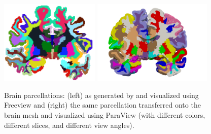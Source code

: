 %
%
\begin{figure}
\begin{center}
  \hspace{2em}
  \includegraphics[height=4cm]{./graphics/chp4/parcellation-coronalwhiteBG_2.png}
  \includegraphics[height=4cm]{./graphics/chp4/ernie32-parcellation-basic.png}
  \caption{Brain parcellations: (left) as generated by \freesurfer{} and visualized 
   using Freeview and (right) the same parcellation transferred onto the {\fenics} 
   brain mesh and visualized using ParaView (with different colors, different 
   slices, and different view angles).} 
  \label{fig:chp4:freesurfer-parc}
\end{center}
\end{figure}

